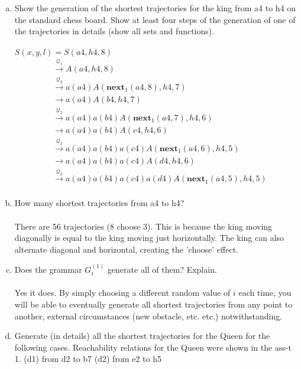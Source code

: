 \documentclass[11pt]{article}
\begin{document}
\begin{enumerate}[(a)]
\item Show the generation of the shortest trajectories for the king from a4 to h4 on the standard chess board. Show at least four steps of the generation of one of the trajectories in details (show all sets and functions). \\\\
$S(x,y,l) = S(a4, h4, 8)$
\begin{align*}
&\overset{\mathcal{Q}_1}{\rightarrow} A(a4, h4, 8)\\
&\overset{\mathcal{Q}_2}{\rightarrow} a(a4)A(\textbf{next}_1 (a4, 8), h4, 7)\\
&\rightarrow a(a4)A(b4, h4, 7)\\
&\overset{\mathcal{Q}_2}{\rightarrow} a(a4)a(b4)A(\textbf{next}_1 (a4, 7), h4, 6)\\
&\rightarrow a(a4)a(b4)A(c4, h4, 6)\\
&\overset{\mathcal{Q}_2}{\rightarrow} a(a4)a(b4)a(c4)A(\textbf{next}_1 (a4, 6), h4, 5)\\
&\rightarrow a(a4)a(b4)a(c4)A(d4, h4, 6)\\
&\overset{\mathcal{Q}_2}{\rightarrow}a(a4)a(b4)a(c4)a(d4)A(\textbf{next}_1 (a4, 5), h4, 5)\\
\end{align*}
\item How many shortest trajectories from a4 to h4? \\\\
There are 56 trajectories (8 choose 3). This is because the king moving diagonally is equal to the king moving just horizontally. The king can also alternate diagonal and horizontal, creating the 'choose' effect. 
\item Does the grammar $G_t^(1)$ generate all of them? Explain. \\\\
Yes it does. By simply choosing a different random value of $i$ each time, you will be able to eventually generate all shortest trajectories from any point to another, external circumstances (new obstacle, etc. etc.) notwithstanding. 
\item Generate (in details) all the shortest trajectories for the Queen for the following cases. Reachability relations for the Queen were shown in the ass-t 1. (d1) from d2 to b7 (d2) from e2 to h5
\end{enumerate}
\end{document}
